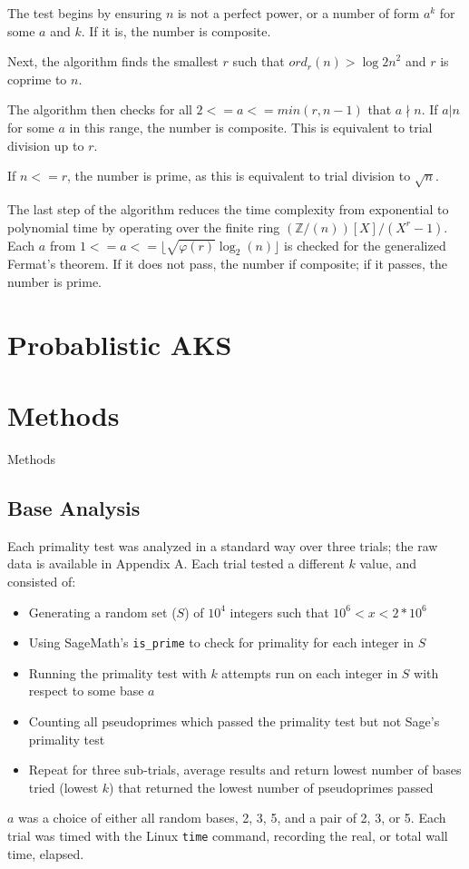 \documentclass{article}
\begin{document}
The test begins by ensuring $n$ is not a perfect power, or a number of form $a^k$ for some $a$ and $k$. If it is, the number is composite.

Next, the algorithm finds the smallest $r$ such that $ord_r(n) > {\log{2}{n}}^2$ and $r$ is coprime to $n$.

The algorithm then checks for all $2 <= a <= min(r, n - 1)$ that $a \nmid n$. If $a \vert n$ for some $a$ in this range, the number is composite. This is equivalent to trial division up to $r$.

If $n <= r$, the number is prime, as this is equivalent to trial division to $\sqrt{n}$.

The last step of the algorithm reduces the time complexity from exponential to polynomial time by operating over the finite ring $(\mathbb{Z}/(n))[X] / (X^r - 1)$. Each $a$ from $1 <= a <= \lfloor \sqrt{\varphi(r)}\log_2(n) \rfloor$ is checked for the generalized Fermat's theorem. If it does not pass, the number if composite; if it passes, the number is prime.

\section{Probablistic AKS}

\section{Methods}
Methods

\subsection{Base Analysis}
Each primality test was analyzed in a standard way over three trials; the raw data is available in Appendix A. Each trial tested a different $k$ value, and consisted of: %
\begin{itemize}
    \item{Generating a random set ($S$) of $10^4$ integers such that $10^6 < x < 2*10^6$}
    \item{Using SageMath's \texttt{is\_prime} to check for primality for each integer in $S$}
    \item{Running the primality test with $k$ attempts run on each integer in $S$ with respect to some base $a$}
    \item{Counting all pseudoprimes which passed the primality test but not Sage's primality test}
    \item{Repeat for three sub-trials, average results and return lowest number of bases tried (lowest $k$) that returned the lowest number of pseudoprimes passed}
\end{itemize}
$a$ was a choice of either all random bases, 2, 3, 5, and a pair of 2, 3, or 5. Each trial was timed with the Linux \texttt{time} command, recording the real, or total wall time, elapsed. 
\end{document}
